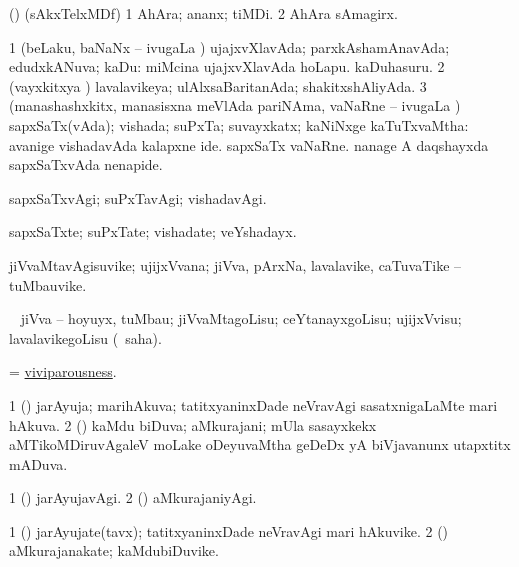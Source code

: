 \bentry
{} 
\gl{\nA}
\expl{}
\bmng
 (\bava) (sAkxTelxMDf) 
\bnum
\num{1} AhAra; ananx; tiMDi. 
\num{2} AhAra sAmagirx. 
\enum
\emng
\eentry

\bentry 
{} 
\gl{\gu}
\expl{}
\bmng
\bnum
\num{1} (beLaku, baNaNx -- ivugaLa \vi) ujajxvXlavAda; parxkAshamAnavAda; edudxkANuva; kaDu:  miMcina ujajxvXlavAda hoLapu.  kaDuhasuru. 
\num{2} (vayxkitxya \vi) lavalavikeya; ulAlxsaBaritanAda; shakitxshAliyAda. 
\num{3} (manashashxkitx, manasisxna meVlAda pariNAma, vaNaRne -- ivugaLa \vi) sapxSaTx(vAda); vishada; suPxTa; suvayxkatx; kaNiNxge kaTuTxvaMtha:  avanige vishadavAda kalapxne ide.  sapxSaTx vaNaRne.  nanage A daqshayxda sapxSaTxvAda nenapide. 
\enum
\emng
\eentry

\bentry 
{} 
\gl{\kirxvi}
\expl{}
\bmng
 sapxSaTxvAgi; suPxTavAgi; vishadavAgi. 
\emng
\eentry

\bentry 
{} 
\gl{\nA}
\expl{}
\bmng
 sapxSaTxte; suPxTate; vishadate; veYshadayx. 
\emng
\eentry

\bentry
{} 
\gl{\nA}
\expl{}
\bmng
 jiVvaMtavAgisuvike; ujijxVvana; jiVva, pArxNa, lavalavike, caTuvaTike -- tuMbauvike. 
\emng
\eentry

\bentry
{} 
\gl{\akirx}
\BUkaq\  \bmng
 jiVva -- hoyuyx, tuMbau; jiVvaMtagoLisu; ceYtanayxgoLisu; ujijxVvisu; lavalavikegoLisu (\rUpa\ saha). 
\emng
\eentry

\bentry 
{} 
\gl{\nA}
\expl{}
\bmng
 = \hyperlink{viviparousness}{viviparousness}. 
\emng
\eentry

\bentry 
{} 
\gl{\gu}
\expl{}
\bmng
\bnum
\num{1} (\pArxvi) jarAyuja; marihAkuva; tatitxyaninxDade neVravAgi sasatxnigaLaMte mari hAkuva. 
\num{2} (\savi) kaMdu biDuva; aMkurajani; mUla sasayxkekx aMTikoMDiruvAgaleV moLake oDeyuvaMtha geDeDx yA biVjavanunx utapxtitx mADuva. 
\enum
\emng
\eentry

\bentry 
{} 
\gl{\kirxvi}
\expl{}
\bmng
\bnum
\num{1} (\pArxvi) jarAyujavAgi. 
\num{2} (\savi) aMkurajaniyAgi. 
\enum
\emng
\eentry

\bentry
{} 
\gl{\nA}
\expl{}
\bmng
\bnum
\num{1} (\pArxvi) jarAyujate(tavx); tatitxyaninxDade neVravAgi mari hAkuvike. 
\num{2} (\savi) aMkurajanakate; kaMdubiDuvike. 
\enum
\emng
\eentry

